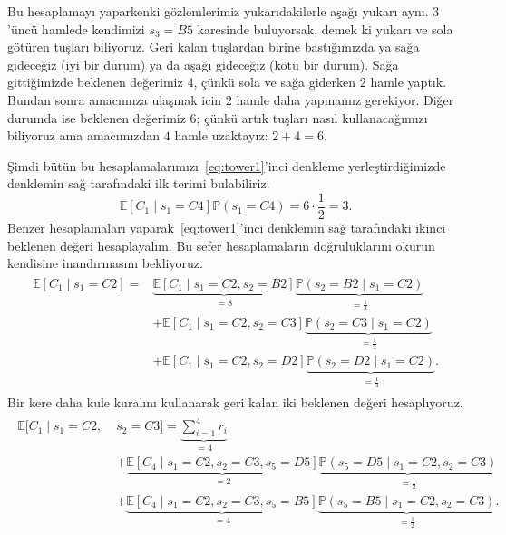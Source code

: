 %
Bu hesaplamay{\i} yaparkenki g\"{o}zlemlerimiz yukar{\i}dakilerle
a\c{s}a\u{g}{\i} yukar{\i} ayn{\i}. $3$'\"{u}nc\"{u} hamlede kendimizi $s_3 =
B5$ karesinde buluyorsak, demek ki yukar{\i} ve sola g\"{o}t\"{u}ren
tu\c{s}lar{\i} biliyoruz. Geri kalan tu\c{s}lardan birine
bast{\i}\u{g}{\i}m{\i}zda ya sa\u{g}a gidece\u{g}iz (iyi bir durum) ya da
a\c{s}a\u{g}{\i} gidece\u{g}iz (k\"{o}t\"{u} bir durum). Sa\u{g}a
gitti\u{g}imizde beklenen de\u{g}erimiz $4$, \c{c}\"{u}nk\"{u} sola ve sa\u{g}a
giderken $2$ hamle yapt{\i}k. Bundan sonra amac{\i}m{\i}za ula\c{s}mak icin $2$
hamle daha yapmam{\i}z gerekiyor. Di\u{g}er durumda ise beklenen de\u{g}erimiz
$6$; \c{c}\"{u}nk\"{u} art{\i}k tu\c{s}lar{\i} nas{\i}l
kullanaca\u{g}{\i}m{\i}z{\i} biliyoruz ama amac{\i}m{\i}zdan $4$ hamle
uzaktay{\i}z: $2+4 = 6$.

\c{S}imdi b\"{u}t\"{u}n bu hesaplamalar{\i}m{\i}z{\i}~\eqref{eq:tower1}'inci
denkleme yerle\c{s}tirdi\u{g}imizde denklemin sa\u{g} taraf{\i}ndaki ilk terimi
bulabiliriz.
%
\begin{equation}
    \mathbb{E}[C_1 \mid s_1=C4]\mathbb{P}(s_1=C4) = 6 \cdot \frac{1}{2} = 3.
    \label{eq:first_term}
\end{equation}
%
Benzer hesaplamalar{\i} yaparak~\eqref{eq:tower1}'inci denklemin sa\u{g}
taraf{\i}ndaki ikinci beklenen de\u{g}eri hesaplayal{\i}m. Bu sefer
hesaplamalar{\i}n do\u{g}ruluklar{\i}n{\i} okurun kendisine
inand{\i}rmas{\i}n{\i} bekliyoruz.
%
\begin{align}
    \begin{split}
    \mathbb{E}\left[ C_1 \mid s_1 = C2 \right] =
    &\underbrace{\mathbb{E}[C_1 \mid s_1 = C2, s_2 = B2]}_{=8} \underbrace{\mathbb{P}(s_2 = B2 \mid s_1 = C2)}_{=\frac{1}{3}} \\
    &+ \mathbb{E}[C_1 \mid s_1=C2, s_2 = C3] \underbrace{\mathbb{P}(s_2 = C3 \mid s_1 = C2)}_{=\frac{1}{3}} \\
    &+ \mathbb{E}[C_1 \mid s_1 = C2, s_2 = D2] \underbrace{\mathbb{P}(s_2 = D2 \mid s_1 = C2)}_{=\frac{1}{3}}.
    \end{split}
    \label{eq:tower3}
\end{align}
%
Bir kere daha kule kural{\i}n{\i} kullanarak geri kalan iki beklenen de\u{g}eri
hesapl{\i}yoruz.
%
\begin{align}
    \begin{split}
    \mathbb{E}[C_1 \mid s_1=C2, \; &s_2=C3] = \underbrace{\sum_{i=1}^4 r_i}_{=4} \\
    &+ \underbrace{\mathbb{E}[C_4 \mid s_1=C2, s_2=C3, s_5=D5]}_{=2} \underbrace{\mathbb{P}(s_5=D5 \mid s_1=C2, s_2=C3)}_{=\frac{1}{2}} \\
    &+ \underbrace{\mathbb{E}[C_4 \mid s_1=C2, s_2=C3, s_5=B5]}_{=4} \underbrace{\mathbb{P}(s_5=B5 \mid s_1=C2, s_2=C3)}_{=\frac{1}{2}}.
    \end{split}
\end{align}
